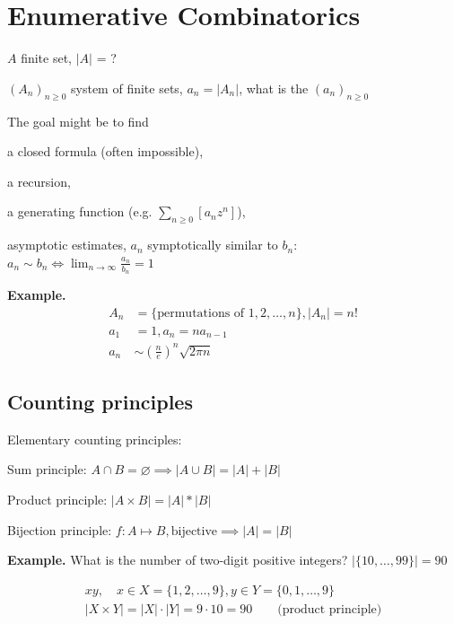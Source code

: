 
\section{Enumerative Combinatorics}

\strut{}
$A$ finite set, $|A|$ = ?

$(A_n)_{n ≥ 0}$ system of finite sets, $a_n = |A_n|$, what is the  $(a_n)_{n ≥ 0}$

The goal might be to find
\begin{compactitem}
  \item a closed formula (often impossible),
  \item a recursion,
  \item a generating function (e.g. $\sum_{n \geq 0}[a_n z^n]$),
  \item asymptotic estimates, $a_n$ symptotically similar to $b_n$:\\
    $a_n \sim b_n \iff \lim_{n \to \infty} \frac{a_n}{b_n} = 1$
\end{compactitem}


\textbf{Example.}
\begin{align*}
  A_n &= \{\text{permutations of } 1,2, \ldots, n\}, |A_n| = n! \\
  a_1 &= 1, a_n = n a_{n-1} \\
  a_n &\sim \left(\frac{n}{e} \right)^n \sqrt{2\pi n}
\end{align*}


\subsection{Counting principles}

Elementary counting principles:
\begin{compactenum}
  \item Sum principle:
    $A\cap B = \varnothing \implies |A\cup B| = |A| + |B|$
  \item Product principle:
    $|A\times B| = |A| * |B|$
  \item Bijection principle:
    $f: A\mapsto B, \text{bijective}\implies |A| = |B|$
\end{compactenum}

\textbf{Example.}
What is the number of two-digit positive integers?
$|\{10,\ldots,99\}| = 90$

\begin{gather*}
  xy, \quad x\in X=\{1,2,\ldots ,9\}, y\in Y = \{0,1,\ldots ,9\} \\
  |X\times Y| = |X| \cdot |Y| = 9\cdot 10 = 90
    \qquad\text{(product principle)}
\end{gather*}

